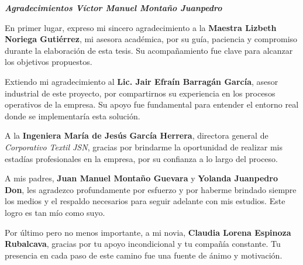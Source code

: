 \documentclass[12pt,letterpaper,spanish]{report}
\newenvironment{dedication}{\newpage\large\null\em\vskip1in}%
{\vfill}
\begin{document}
        \thispagestyle{empty}

\begin{dedication}
  \textbf{Agradecimientos Víctor Manuel Montaño Juanpedro}


En primer lugar, expreso mi sincero agradecimiento a la \textbf{Maestra Lizbeth Noriega Gutiérrez}, mi asesora académica, por su guía, paciencia y compromiso durante la elaboración de esta tesis. Su acompañamiento fue clave para alcanzar los objetivos propuestos.

Extiendo mi agradecimiento al \textbf{Lic. Jair Efraín Barragán García}, asesor industrial de este proyecto, por compartirnos su experiencia en los procesos operativos de la empresa. Su apoyo fue fundamental para entender el entorno real donde se implementaría esta solución.

A la \textbf{Ingeniera María de Jesús García Herrera}, directora general de \textit{Corporativo Textil JSN}, gracias por brindarme la oportunidad de realizar mis estadías profesionales en la empresa, por su confianza a lo largo del proceso.

A mis padres, \textbf{Juan Manuel Montaño Guevara} y \textbf{Yolanda Juanpedro Don}, les agradezco profundamente por esfuerzo y por haberme brindado siempre los medios y el respaldo necesarios para seguir adelante con mis estudios. Este logro es tan mío como suyo.

Por último pero no menos importante, a mi novia, \textbf{Claudia Lorena Espinoza Rubalcava}, gracias por tu apoyo incondicional y tu compañía constante. Tu presencia en cada paso de este camino fue una fuente de ánimo y motivación.

\end{dedication}
    
\end{document}
